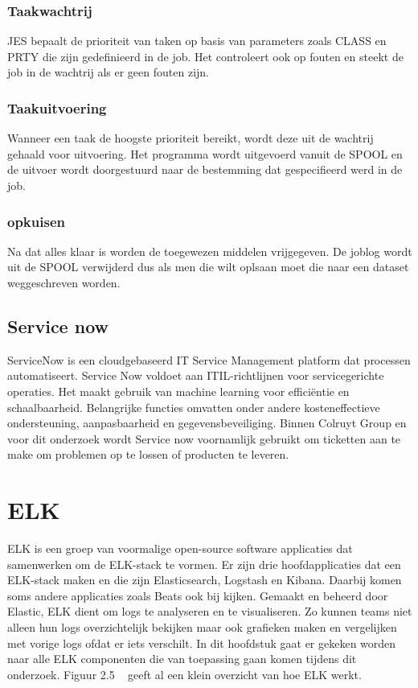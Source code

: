 \subsubsection{Taakwachtrij}
JES bepaalt de prioriteit van taken op basis van parameters zoals CLASS en PRTY die zijn gedefinieerd in de job. Het controleert ook op fouten en steekt de job in de wachtrij als er geen fouten zijn.

\subsubsection{Taakuitvoering}
Wanneer een taak de hoogste prioriteit bereikt, wordt deze uit de wachtrij gehaald voor uitvoering. Het programma wordt uitgevoerd vanuit de SPOOL en de uitvoer wordt doorgestuurd naar de bestemming dat gespecifieerd werd in de job.

\subsubsection{opkuisen}
Na dat alles klaar is worden de toegewezen middelen vrijgegeven. De joblog wordt uit de SPOOL verwijderd dus als men die wilt oplsaan moet die naar een dataset weggeschreven worden.

\subsection{Service now}
ServiceNow is een cloudgebaseerd IT Service Management platform dat processen automatiseert. Service Now voldoet aan ITIL-richtlijnen voor servicegerichte operaties. Het maakt gebruik van machine learning voor efficiëntie en schaalbaarheid. Belangrijke functies omvatten onder andere  kosteneffectieve ondersteuning, aanpasbaarheid en gegevensbeveiliging. Binnen Colruyt Group en voor dit onderzoek wordt Service now voornamlijk gebruikt om ticketten aan te make om problemen op te lossen of producten te leveren. ~\autocite{DavidTaylor}

\section{ELK}
ELK is een groep van voormalige open-source software applicaties dat samenwerken om de ELK-stack te vormen. Er zijn drie hoofdapplicaties dat een ELK-stack maken en die zijn Elasticsearch, Logstash en Kibana. Daarbij komen soms andere applicaties zoals Beats ook bij kijken. Gemaakt en beheerd door Elastic, ELK dient om logs te analyseren en te visualiseren. Zo kunnen teams niet alleen hun logs overzichtelijk bekijken maar ook grafieken maken en vergelijken met vorige logs ofdat er iets verschilt. In dit hoofdstuk gaat er gekeken worden naar alle ELK componenten die van toepassing gaan komen tijdens dit onderzoek. Figuur 2.5 ~\autocite{DavidTaylor} geeft al een klein overzicht van hoe ELK werkt.~\autocite{DavidTaylor,DotanHorovits}


